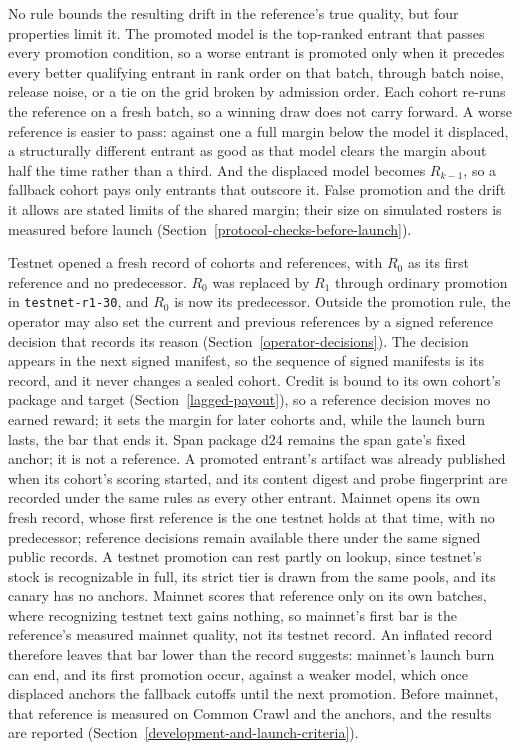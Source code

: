 No rule bounds the resulting drift in the
reference's true quality, but four properties limit it. The promoted model is
the top-ranked entrant that passes every promotion condition, so a worse entrant
is promoted only when it precedes every better qualifying entrant in rank
order on that batch, through batch noise, release noise, or a tie on the grid
broken by admission order. Each
cohort re-runs the reference on a fresh batch, so a winning draw
does not carry forward. A worse reference is easier to pass: against one a full
margin below the model it displaced, a structurally different entrant as good as
that model clears the margin about half the time rather than a third. And the
displaced model becomes \(R_{k-1}\), so a fallback cohort pays only entrants that
outscore it. False promotion and the drift it allows are stated limits of the
shared margin; their size on simulated rosters is measured before launch
(Section~\ref{protocol-checks-before-launch}).

Testnet opened a fresh record of cohorts and references, with \(R_0\) as its
first reference and no predecessor. \(R_0\) was replaced by \(R_1\) through
ordinary promotion in \texttt{testnet-r1-30}, and \(R_0\) is now its
predecessor. Outside the promotion rule, the operator
may also set the current and previous references by a signed reference
decision that records its reason (Section~\ref{operator-decisions}). The
decision appears in the next signed manifest, so the sequence of signed
manifests is its record, and it never changes a sealed cohort. Credit is bound
to its own cohort's package and target (Section~\ref{lagged-payout}), so a
reference decision moves no earned reward; it sets the margin for later cohorts
and, while the launch burn lasts, the bar that ends it. Span package d24
remains the span gate's fixed anchor; it is not a reference. A promoted
entrant's artifact was already published when its cohort's scoring started,
and its content digest and probe fingerprint are recorded under the same
rules as every other entrant. Mainnet opens its own
fresh record, whose first reference is the one testnet holds at that
time, with no predecessor; reference decisions remain available there under
the same signed public records. A testnet
promotion can rest partly on lookup, since testnet's stock is recognizable in
full, its strict tier is drawn from the same pools, and its canary has no
anchors. Mainnet scores that reference only on its own batches, where
recognizing testnet text gains nothing, so mainnet's first bar is the
reference's measured mainnet quality, not its testnet record. An inflated record
therefore leaves that bar lower than the record suggests: mainnet's launch burn
can end, and its first promotion occur, against a weaker model, which once
displaced anchors the fallback cutoffs until the next promotion. Before
mainnet, that reference is measured on Common Crawl and the anchors, and the
results are reported (Section~\ref{development-and-launch-criteria}).

